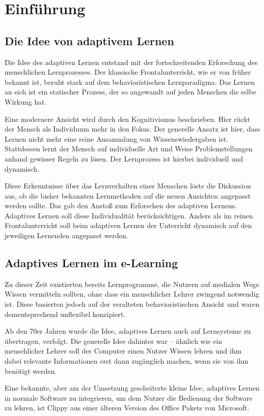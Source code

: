 \chapter{Einführung}

\section{Die Idee von adaptivem Lernen}
Die Idee des adaptiven Lernen entstand mit der fortschreitenden
Erforschung des menschlichen Lernprozesses.
Der klassische Frontalunterricht, wie er von früher bekannt ist,
beruht stark auf dem behavioristischen Lernparadigma.
Das Lernen an sich ist ein statischer Prozess, der so angewandt
auf jeden Menschen die selbe Wirkung hat.

Eine modernere Ansicht wird durch den Kognitivismus
beschrieben. Hier rückt der Mensch als Individuum mehr in den Fokus.
Der generelle Ansatz ist hier, dass Lernen nicht mehr eine reine
Ansammlung von Wissenswiedergaben ist. Stattdessen lernt der Mensch
auf individuelle Art und Weise Problemstellungen anhand gewisser Regeln zu lösen.
Der Lernprozess ist hierbei individuell und dynamisch.

Diese Erkenntnisse über das Lernverhalten eines Menschen löste die Diskussion aus,
ob die bisher bekannten Lernmethoden auf die neuen Ansichten angepasst werden sollte.
Das gab den Anstoß zum Erforschen des adaptiven Lernens.
Adaptives Lernen soll diese Individualität berücksichtigen.
Anders als im reinen Frontalunterricht soll beim adaptiven Lernen
der Unterricht dynamisch auf den jeweiligen Lernenden angepasst werden.

\section{Adaptives Lernen im e-Learning}
Zu dieser Zeit existierten bereits Lernprogramme, die Nutzern
auf medialen Wege Wissen vermitteln sollten, ohne dass ein menschlicher Lehrer
zwingend notwendig ist. Diese basierten jedoch auf der veralteten behavioristischen
Ansicht und waren dementsprechend unflexibel konzipiert.

Ab den 70er Jahren wurde die Idee, adaptives Lernen auch auf Lernsysteme
zu übertragen, verfolgt. Die generelle Idee dahinter war -- ähnlich wie ein
menschlicher Lehrer soll der Computer einen Nutzer Wissen lehren und
ihm dabei relevante Informationen erst dann zugänglich machen, wenn sie von ihm
benötigt werden.

Eine bekannte, aber am der Umsetzung gescheiterte kleine Idee, adaptives Lernen
in normale Software zu integrieren, um dem Nutzer die Bedienung der Software zu lehren,
ist \glqq Clippy\grqq{} aus einer älteren Version des Office Pakets von Microsoft.

